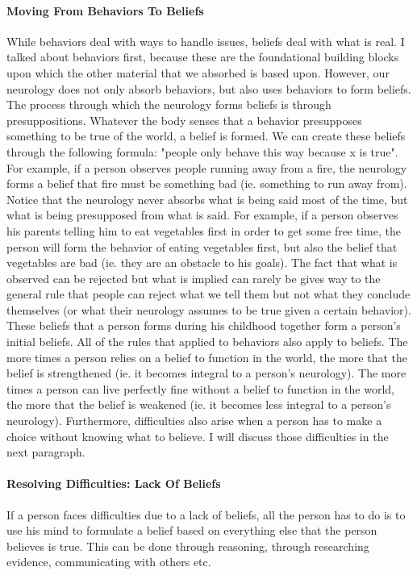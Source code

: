 \documentclass[a4paper, 12pt]{article}
\begin{document}
\paragraph{Moving From Behaviors To Beliefs}
While behaviors deal with ways to handle issues, beliefs deal with what is real. I talked about behaviors first, because these are the foundational building blocks upon which the other material that we absorbed is based upon. However, our neurology does not only absorb behaviors, but also uses behaviors to form beliefs. The process through which the neurology forms beliefs is through presuppositions. Whatever the body senses that a behavior presupposes something to be true of the world, a belief is formed. We can create these beliefs through the following formula: "people only behave this way because x is true". For example, if a person observes people running away from a fire, the neurology forms a belief that fire must be something bad (ie. something to run away from). Notice that the neurology never absorbs what is being said most of the time, but what is being presupposed from what is said. For example, if a person observes his parents telling him to eat vegetables first in order to get some free time, the person will form the behavior of eating vegetables first, but also the belief that vegetables are bad (ie. they are an obstacle to his goals). The fact that what is observed can be rejected but what is implied can rarely be gives way to the general rule that people can reject what we tell them but not what they conclude themselves (or what their neurology assumes to be true given a certain behavior). These beliefs that a person forms during his childhood together form a person's initial beliefs. All of the rules that applied to behaviors also apply to beliefs. The more times a person relies on a belief to function in the world, the more that the belief is strengthened (ie. it becomes integral to a person's neurology). The more times a person can live perfectly fine without a belief to function in the world, the more that the belief is weakened (ie. it becomes less integral to a person's neurology). Furthermore, difficulties also arise when a person has to make a choice without knowing what to believe. I will discuss those difficulties in the next paragraph. \\
\paragraph{Resolving Difficulties: Lack Of Beliefs}
If a person faces difficulties due to a lack of beliefs, all the person has to do is to use his mind to formulate a belief based on everything else that the person believes is true. This can be done through reasoning, through researching evidence, communicating with others etc. \\
\end{document}

